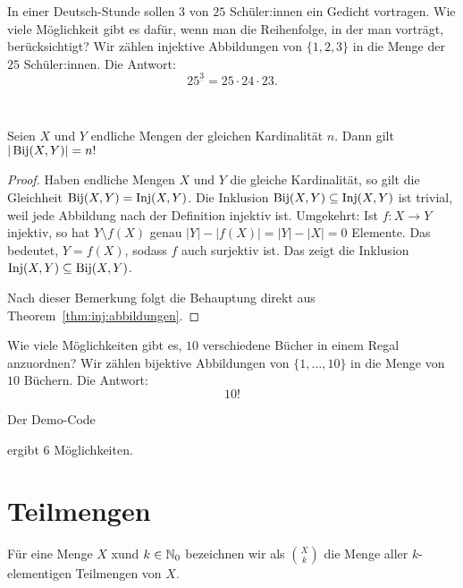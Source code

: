 \begin{bsp}
		In einer Deutsch-Stunde sollen  $3$ von $25$ Schüler:innen ein Gedicht vortragen. Wie viele Möglichkeit gibt es dafür, wenn man die Reihenfolge, in der man vorträgt, berücksichtigt? Wir zählen injektive Abbildungen von $\{1,2,3\}$ in die Menge der $25$ Schüler:innen. Die Antwort: 
		\[
			25^{\underline{3}} = 25 \cdot 24 \cdot 23. 
		\]
\end{bsp} 

\begin{bem}\
 
\end{bem}

\begin{kor}
	 Seien $X$ und $Y$ endliche Mengen der gleichen Kardinalität $n$. Dann gilt $|\operatorname{Bij}(X,Y)| = n!$
\end{kor} 
\begin{proof}
	Haben endliche Mengen $X$ und $Y$ die gleiche Kardinalität, so gilt die Gleichheit $\operatorname{Bij}(X,Y ) = \operatorname{Inj}(X,Y)$. Die Inklusion $\operatorname{Bij}(X,Y ) \subseteq \operatorname{Inj}(X,Y)$ ist trivial, weil jede Abbildung nach der Definition injektiv ist. Umgekehrt: Ist $f: X \to Y$ injektiv, so hat $Y \setminus f(X)$ genau $|Y| - |f(X)| = |Y| - |X| =0$ Elemente. Das bedeutet, $Y = f(X)$, sodass $f$ auch surjektiv ist. Das zeigt die Inklusion $\operatorname{Inj}(X,Y) \subseteq \operatorname{Bij}(X,Y)$. 
	
	Nach dieser Bemerkung folgt die Behauptung direkt aus Theorem~\ref{thm:inj:abbildungen}. 
\end{proof} 

\begin{bsp}
	Wie viele Möglichkeiten gibt es, $10$ verschiedene Bücher in einem Regal anzuordnen? Wir zählen bijektive Abbildungen von $\{1,\ldots,10\}$ in die Menge von $10$ Büchern. Die Antwort: 
	\[
			10!
	\]
\end{bsp} 

\begin{bem} Der Demo-Code 

ergibt $6$ Möglichkeiten. 
\end{bem} 

\section{Teilmengen} 

\begin{defn}
Für eine Menge $X$ xund $k \in \mathbb{N}_0$ bezeichnen wir als $\binom{X}{k}$ die Menge aller $k$-elementigen Teilmengen von $X$. 
\end{defn}

